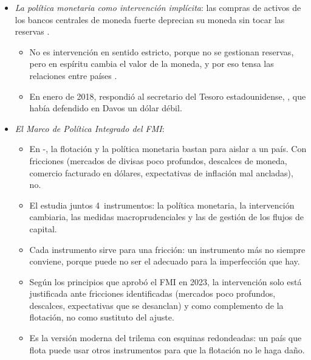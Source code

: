 \documentclass[11pt]{article}
\begin{document}
\begin{itemize}
\item \emph{La política monetaria como intervención implícita}: las compras de activos de los bancos centrales de moneda fuerte deprecian su moneda sin tocar las reservas\nocite{DedolaEtAl2021Bazooka} .
  \begin{itemize}
  \item No es intervención en sentido estricto, porque no se gestionan reservas, pero en espíritu cambia el valor de la moneda, y por eso tensa las relaciones entre países .
  \item En enero de 2018,  respondió al secretario del Tesoro estadounidense, , que había defendido en Davos un dólar débil\nocite{BCE2018Draghi,Bloomberg2018DraghiMnuchin}.
  \end{itemize}
\item \emph{El Marco de Política Integrado del FMI}:
  \begin{itemize}
  \item En -, la flotación y la política monetaria bastan para aislar a un país. Con fricciones (mercados de divisas poco profundos, descalces de moneda, comercio facturado en dólares, expectativas de inflación mal ancladas), no.
  \item El  estudia juntos 4~instrumentos: la política monetaria, la intervención cambiaria, las medidas macroprudenciales y las de gestión de los flujos de capital\nocite{BasuEtAl2020Conceptual,FMI2020IPF}.
  \item Cada instrumento sirve para una fricción: un instrumento más no siempre conviene, porque puede no ser el adecuado para la imperfección que hay\nocite{BasuEtAl2020Conceptual}.
  \item Según los principios que aprobó el FMI en 2023, la intervención solo está justificada ante fricciones identificadas (mercados poco profundos, descalces, expectativas que se desanclan) y como complemento de la flotación, no como sustituto del ajuste\nocite{FMI2023IPFIntervencion}.
  \item Es la versión moderna del trilema con esquinas redondeadas: un país que flota puede usar otros instrumentos para que la flotación no le haga daño.
  \end{itemize}
\end{itemize}

\end{document}
